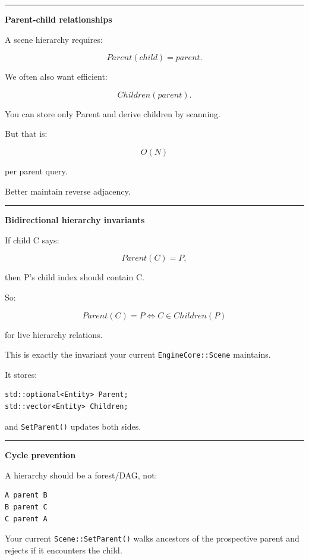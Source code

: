 \begin{center}\rule{0.5\linewidth}{0.5pt}\end{center}

\textbf{Parent-child relationships}

A scene hierarchy requires:

\[
Parent(child)=parent.
\]

We often also want efficient:

\[
Children(parent).
\]

You can store only Parent and derive children by scanning.

But that is:

\[
O(N)
\]

per parent query.

Better maintain reverse adjacency.

\begin{center}\rule{0.5\linewidth}{0.5pt}\end{center}

\textbf{Bidirectional hierarchy invariants}

If child C says:

\[
Parent(C)=P,
\]

then P's child index should contain C.

So:

\[
\boxed{
Parent(C)=P
\iff
C\in Children(P)
}
\]

for live hierarchy relations.

This is exactly the invariant your current \texttt{EngineCore::Scene} maintains.

It stores:

\begin{verbatim}
std::optional<Entity> Parent;
std::vector<Entity> Children;
\end{verbatim}

and \texttt{SetParent()} updates both sides.

\begin{center}\rule{0.5\linewidth}{0.5pt}\end{center}

\textbf{Cycle prevention}

A hierarchy should be a forest/DAG, not:

\begin{verbatim}
A parent B
B parent C
C parent A
\end{verbatim}

Your current \texttt{Scene::SetParent()} walks ancestors of the prospective parent and rejects if it encounters the child.

